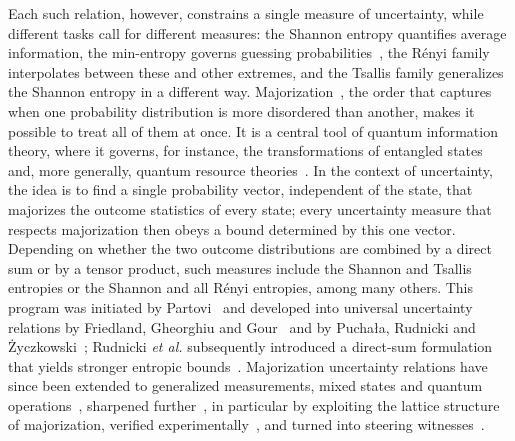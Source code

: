 \documentclass[aps,pra,twocolumn,superscriptaddress,nofootinbib,floatfix]{revtex4-2}
\theoremstyle{definition}
\begin{document}
Each such relation, however, constrains a single measure of uncertainty, while
different tasks call for different measures: the Shannon entropy quantifies
average information, the min-entropy governs guessing
probabilities~\cite{KRS2009}, the R\'enyi family interpolates between these
and other extremes, and the Tsallis family generalizes the Shannon entropy in a
different way.
Majorization~\cite{MarshallOlkin2011}, the order that captures when one
probability distribution is more disordered than another, makes it possible to
treat all of them at once.
It is a central tool of quantum information theory, where it governs, for
instance, the transformations of entangled states~\cite{Nielsen1999} and,
more generally, quantum resource
theories~\cite{Gour2015,ChitambarGour2019}.
In the context of uncertainty, the idea is to find a single probability vector,
independent of the state, that majorizes the outcome statistics of every state;
every uncertainty measure that respects majorization then obeys a bound
determined by this one vector. Depending on whether the two outcome
distributions are combined by a direct sum or by a tensor product, such measures
include the Shannon and Tsallis entropies or the Shannon and all R\'enyi
entropies, among many others.
This program was initiated by Partovi~\cite{Partovi2011} and developed into
universal uncertainty relations by Friedland, Gheorghiu and Gour~\cite{FGG2013}
and by Pucha{\l}a, Rudnicki and {\.Z}yczkowski~\cite{PRZ2013}; Rudnicki
\emph{et al.} subsequently introduced a direct-sum formulation that yields
stronger entropic bounds~\cite{RPZ2014}.
Majorization uncertainty relations have since been extended to generalized
measurements, mixed states and quantum
operations~\cite{RasteginZyczkowski2016,Baek2019,Puchala2018},
sharpened further~\cite{Li2016,LiQiao2019,XiaoFangGour2019,Yuan2023}, in
particular by exploiting the lattice structure of majorization, verified
experimentally~\cite{Wang2020,Yuan2023}, and turned into steering
witnesses~\cite{YangQiao2026}.
\end{document}
